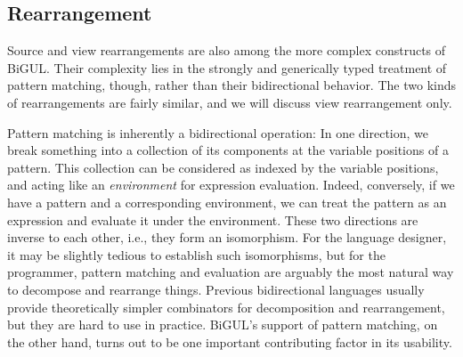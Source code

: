 \subsection{Rearrangement}

Source and view rearrangements are also among the more complex constructs of BiGUL.
Their complexity lies in the strongly and generically typed treatment of pattern matching, though, rather than their bidirectional behavior.
The two kinds of rearrangements are fairly similar, and we will discuss view rearrangement only.

Pattern matching is inherently a bidirectional operation:
In one direction, we break something into a collection of its components at the variable positions of a pattern.
This collection can be considered as indexed by the variable positions, and acting like an \emph{environment} for expression evaluation.
Indeed, conversely, if we have a pattern and a corresponding environment, we can treat the pattern as an expression and evaluate it under the environment.
These two directions are inverse to each other, i.e., they form an isomorphism.
For the language designer, it may be slightly tedious to establish such isomorphisms, but for the programmer, pattern matching and evaluation are arguably the most natural way to decompose and rearrange things.
Previous bidirectional languages usually provide theoretically simpler combinators for decomposition and rearrangement, but they are hard to use in practice.
BiGUL's support of pattern matching, on the other hand, turns out to be one important contributing factor in its usability.

